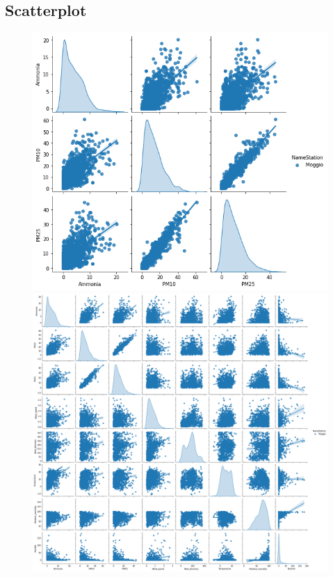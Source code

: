 \documentclass{article}
\begin{document}
\subsection{Scatterplot}
\begin{figure}[H]
  \centering
  \includegraphics[scale = 0.55]{Picture/Scatter/MoggioScatter.png}
  \includegraphics[scale = 0.3]{Picture/Scatter/MoggioScatterBig.png}
  \centering 
\end{figure}
\end{document}
